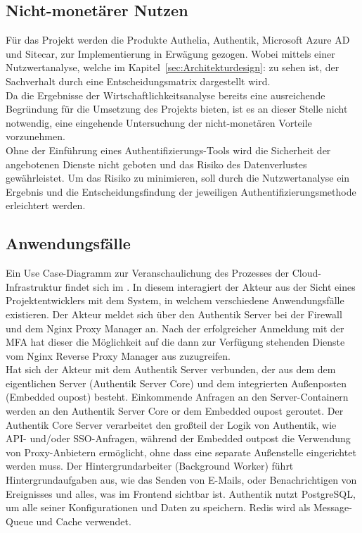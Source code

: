 \subsection{Nicht-monetärer Nutzen}
\label{sec:Nicht-monetärer Nutzen}
Für das Projekt werden die Produkte Authelia, Authentik, Microsoft Azure AD und Sitecar, zur Implementierung in Erwägung gezogen. 
Wobei mittels einer Nutzwertanalyse, welche im Kapitel~\ref{sec:Architekturdesign}:  zu sehen ist, der 
Sachverhalt durch eine Entscheidungsmatrix dargestellt wird.
\\Da die Ergebnisse der Wirtschaftlichkeitsanalyse bereits eine ausreichende Begründung für die Umsetzung des Projekts bieten, 
ist es an dieser Stelle nicht notwendig, eine eingehende Untersuchung der nicht-monetären Vorteile vorzunehmen.
\\Ohne der Einführung eines Authentifizierungs-Tools wird die Sicherheit der angebotenen Dienste nicht geboten und das Risiko des 
Datenverlustes gewährleistet. Um das Risiko zu minimieren, soll durch die Nutzwertanalyse ein Ergebnis und die Entscheidungsfindung 
der jeweiligen Authentifizierungsmethode erleichtert werden.


\subsection{Anwendungsfälle}
\label{sec:Anwendungsfaelle}
Ein Use Case-Diagramm zur Veranschaulichung des Prozesses der Cloud-Infrastruktur findet sich im .
In diesem interagiert der Akteur aus der Sicht eines Projektentwicklers mit dem System, in welchem verschiedene 
Anwendungsfälle existieren. Der Akteur meldet sich über den Authentik Server bei der Firewall und dem Nginx Proxy Manager an. 
Nach der erfolgreicher Anmeldung mit der MFA hat dieser die Möglichkeit auf die dann zur Verfügung stehenden Dienste vom 
Nginx Reverse Proxy Manager aus zuzugreifen.
\\Hat sich der Akteur mit dem Authentik Server verbunden, der aus dem dem eigentlichen Server (Authentik Server Core) und dem 
integrierten Außenposten (Embedded oupost) besteht. Einkommende Anfragen an den Server-Containern werden an den Authentik Server Core 
or dem Embedded oupost geroutet. Der Authentik Core Server verarbeitet den großteil der Logik von Authentik, wie \zB API- und/oder 
SSO-Anfragen, während der Embedded outpost die Verwendung von Proxy-Anbietern ermöglicht, ohne dass eine separate Außenstelle 
eingerichtet werden muss. Der Hintergrundarbeiter (Background Worker) führt Hintergrundaufgaben aus, wie das Senden von E-Mails, 
oder Benachrichtigen von Ereignisses und alles, was im Frontend sichtbar ist. Authentik nutzt PostgreSQL, um alle seiner 
Konfigurationen und Daten zu speichern. Redis wird als Message-Queue und Cache verwendet.